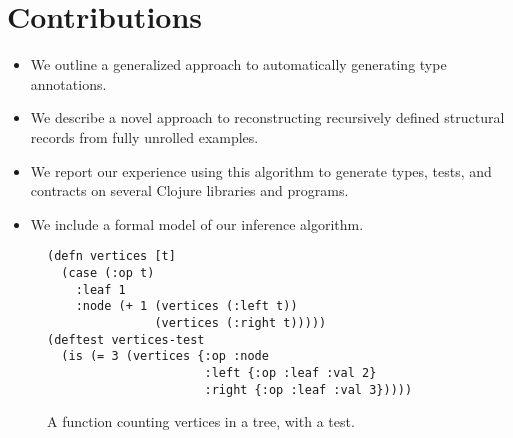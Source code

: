 \section*{Contributions}
\begin{itemize}
\item We outline a generalized approach to automatically
    generating type annotations.
\item
  We describe a novel approach to reconstructing recursively
  defined structural records from fully unrolled examples.
\item
  We report our experience using this algorithm to generate
  types, tests, and contracts on several
  Clojure libraries and programs.
\item
  We include a formal model of our inference algorithm.
\end{itemize}

\begin{figure}
\begin{Verbatim}
(defn vertices [t]
  (case (:op t)
    :leaf 1
    :node (+ 1 (vertices (:left t))
               (vertices (:right t)))))
(deftest vertices-test
  (is (= 3 (vertices {:op :node 
                      :left {:op :leaf :val 2}
                      :right {:op :leaf :val 3}))))
\end{Verbatim}
\caption{A function counting vertices in a tree,
with a test.}
\label{vertices}
\end{figure}
